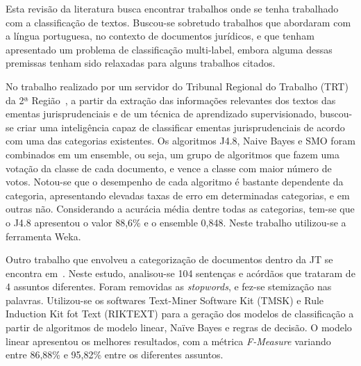 \newcommand{\texCommand}[1]{\texttt{\textbackslash{#1}}}%

\newcommand{\exemplo}[1]{%
\vspace{\baselineskip}%
\noindent\fbox{\begin{minipage}{\textwidth}#1\end{minipage}}%
\\\vspace{\baselineskip}}%

\newcommand{\exemploVerbatim}[1]{%
\vspace{\baselineskip}%
\noindent\fbox{\begin{minipage}{\textwidth}%
#1\end{minipage}}%
\\\vspace{\baselineskip}}%

Esta revisão da literatura busca encontrar trabalhos onde se tenha trabalhado com a classificação de textos. 
Buscou-se sobretudo trabalhos que abordaram com a língua portuguesa, no contexto de documentos jurídicos, e que tenham apresentado um problema de classificação multi-label, embora alguma dessas premissas tenham sido relaxadas para alguns trabalhos citados.


No trabalho realizado por um servidor do Tribunal Regional do Trabalho (TRT) da 2ª Região~\cite{ferauche}, a partir da extração das informações relevantes dos textos das ementas jurisprudenciais e de um técnica de aprendizado supervisionado,  buscou-se criar uma inteligência capaz de classificar ementas jurisprudenciais de acordo com uma das categorias existentes. Os algoritmos J4.8, Naive Bayes e SMO foram combinados em um ensemble, ou seja, um grupo de algoritmos que fazem uma votação da classe de cada documento, e vence a classe com maior número de votos. 
Notou-se que o desempenho de cada algoritmo é bastante dependente da categoria, apresentando elevadas taxas de erro em determinadas categorias, e em outras não. Considerando a acurácia média dentre todas as categorias, tem-se que o J4.8 apresentou o valor 88,6\% e o ensemble 0,848. Neste trabalho utilizou-se a ferramenta Weka.

Outro trabalho que envolveu a categorização de documentos dentro da JT se encontra em~\cite{ticom_aplicacao_2007}. Neste estudo, analisou-se 104 sentenças e acórdãos que trataram de 4 assuntos diferentes. Foram removidas as \textit{stopwords}, e fez-se stemização nas palavras. Utilizou-se os softwares Text-Miner Software Kit (TMSK) e Rule Induction Kit fot Text (RIKTEXT) para a geração dos modelos de classificação a partir de algoritmos de modelo linear, Naïve Bayes e regras de decisão. O modelo linear apresentou os melhores resultados, com a métrica \textit{F-Measure} variando  entre 86,88\% e 95,82\% entre os diferentes assuntos.

